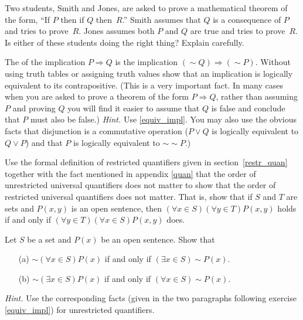 \begin{prob} Two students, Smith and Jones, are asked to prove a mathematical theorem of the form,
``If $P$ then if $Q$ then~$R$.''  Smith assumes that $Q$ is a consequence of $P$ and tries to
prove~$R$. Jones assumes both $P$ and $Q$ are true and tries to prove~$R$. Is either of these
students doing the right thing? Explain carefully.
\end{prob}

\begin{prob} The
 of the implication $P \Rightarrow Q$ is the implication $(\sim
Q)\Rightarrow(\sim P)$.  Without using truth tables or assigning truth values show that an
implication is logically equivalent to its contrapositive.  (This is a very important fact. In
many cases when you are asked to prove a theorem of the form $P \Rightarrow Q$, rather than
assuming $P$ and proving $Q$ you will find it easier to assume that $Q$ is false and conclude
that $P$ must also be false.) \emph{Hint.} Use \ref{equiv_impl}. You may also use the obvious
facts that disjunction is a commutative operation ($P \lor Q$ is logically equivalent to $Q
\lor P$) and that $P$ is logically equivalent to $\sim\sim P$.)
\end{prob}

\begin{prob}\label{prob_ord_restr_quan}  Use the formal definition of restricted quantifiers
given in section~\ref{restr_quan} together with the fact mentioned in appendix \ref{quan}
that the order of unrestricted universal quantifiers does not matter to show that the
order of restricted universal quantifiers does not matter. That is, show that if $S$ and
$T$ are sets and $P(x,y)$ is an open sentence, then $(\forall x \in S)(\forall y \in
T)P(x,y)$ holds if and only if $(\forall y \in T)(\forall x \in S)P(x,y)$ does.
\end{prob}


\begin{prob}\label{prob_neg_restr_quan}  Let $S$ be a set and $P(x)$ be an open sentence. Show that
 \begin{enumerate}
   \item[(a)] $\sim(\forall x \in S)P(x)$ if and only if $(\exists x \in S) \sim P(x)$.
   \item[(b)] $\sim(\exists x \in S)P(x)$ if and only if $(\forall x \in S) \sim
P(x)$.
 \end{enumerate}

\noindent \emph{Hint.} Use the corresponding facts (given in the two paragraphs following
exercise \ref{equiv_impl}) for unrestricted quantifiers.
\end{prob}


\endinput
